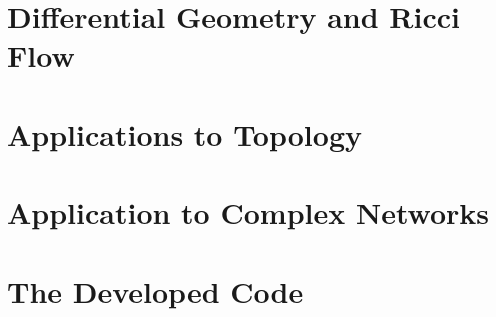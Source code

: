 \documentclass[a4paper,12pt,oneside,customfont,custombib,PageStyleI]{Settings/PhDThesisPSnPDF}
\begin{document}
\chapter{Differential Geometry and Ricci Flow}\label{chap:chapter2}





\chapter{Applications to Topology}\label{chap:chapter3}




\chapter{Application to Complex Networks}\label{chap:chapter4}




\chapter{The Developed Code}\label{chap:chapter5}





%

\backmatter

\begin{spacing}{0.9}

\cleardoublepage
\nocite{*}
\printbibliography[heading=bibintoc, title={References}]

\end{spacing}

\end{document}
